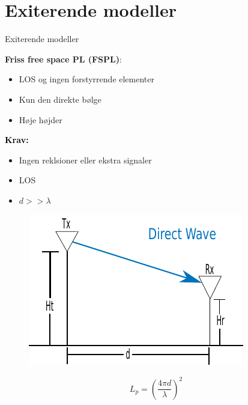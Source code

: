 \section{Exiterende modeller}
\begin{frame}{Exiterende modeller}
\begin{minipage}{.45\textwidth}
\raggedright\textcolor{thomasblue}{\textbf{Friss free space PL (FSPL)}:}
\begin{itemize}
\item LOS og ingen forstyrrende elementer
\item Kun den direkte bølge
\item Høje højder
\end{itemize} 

\vspace{1em}
\textcolor{black}{\textbf{Krav:}}
\begin{itemize}
\item Ingen reklsioner eller ekstra signaler
\item LOS
\item $d >> \lambda$
\end{itemize}
\end{minipage}
\begin{minipage}{0.5\textwidth}

\begin{figure}[!htbp]
 \centering
  \includegraphics[width = \columnwidth]{figures/friss_illu.pdf}
  \end{figure}
\end{minipage}

\vspace{1em}
\begin{equation*}
L_p=\left(\frac{4 \pi d}{\lambda}\right)^2
\end{equation*}
\end{frame}



